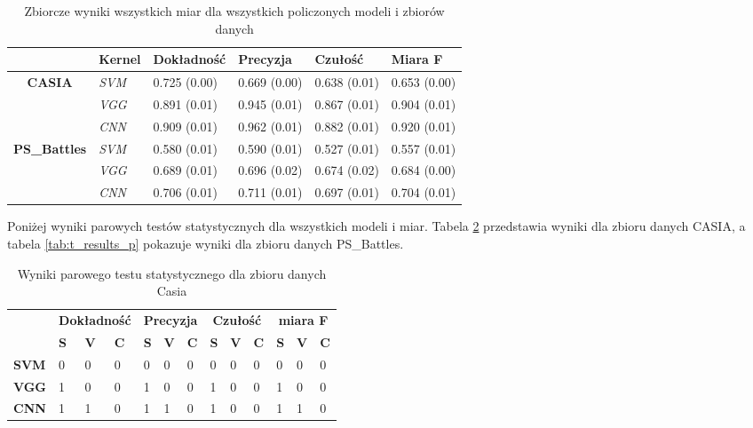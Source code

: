 \begin{table}[h!]
	\centering
	\begin{tabular}{l|l|l|l|l|l|}
		\cline{2-6}
		& \textbf{Kernel} & \textbf{Dokładność} & \textbf{Precyzja} & \textbf{Czułość} & \textbf{Miara F} \\ \hline
		\multicolumn{1}{|c|}{\multirow{3}{*}{\textbf{CASIA}}}       & \textit{SVM} & 0.725 (0.00) & 0.669 (0.00) & 0.638 (0.01) & 0.653 (0.00) \\ \cline{2-6} 
		\multicolumn{1}{|c|}{} & \textit{VGG}    & 0.891 (0.01)        & 0.945 (0.01)      & 0.867 (0.01)     & 0.904 (0.01)     \\ \cline{2-6} 
		\multicolumn{1}{|c|}{} & \textit{CNN}    & 0.909 (0.01)        & 0.962 (0.01)      & 0.882 (0.01)     & 0.920 (0.01)     \\ \hline
		\multicolumn{1}{|l|}{\multirow{3}{*}{\textbf{PS\_Battles}}} & \textit{SVM} & 0.580 (0.01) & 0.590 (0.01) & 0.527 (0.01) & 0.557 (0.01) \\ \cline{2-6} 
		\multicolumn{1}{|l|}{} & \textit{VGG}    & 0.689 (0.01)        & 0.696 (0.02)      & 0.674 (0.02)     & 0.684 (0.00)     \\ \cline{2-6} 
		\multicolumn{1}{|l|}{} & \textit{CNN}    & 0.706 (0.01)        & 0.711 (0.01)      & 0.697 (0.01)     & 0.704 (0.01)     \\ \hline
	\end{tabular}
	\caption{Zbiorcze wyniki wszystkich miar dla wszystkich policzonych modeli i zbiorów danych}
	\label{tab:all_result}
\end{table}

Poniżej wyniki parowych testów statystycznych dla wszystkich modeli i miar. Tabela \ref{tab:t_results} przedstawia wyniki dla zbioru danych CASIA, a tabela \ref{tab:t_results_p} pokazuje wyniki dla zbioru danych PS\_Battles.

\begin{table}[h!]
	\centering
	\begin{tabular}{l|l|l|l|l|l|l|l|l|l|l|l|l|}
		\cline{2-13}
		&
		\multicolumn{3}{c|}{\textbf{Dokładność}} &
		\multicolumn{3}{c|}{\textbf{Precyzja}} &
		\multicolumn{3}{c|}{\textbf{Czułość}} &
		\multicolumn{3}{c|}{\textbf{miara F}} \\ \cline{2-13} 
		&
		\textbf{S} &
		\textbf{V} &
		\textbf{C} &
		\textbf{S} &
		\textbf{V} &
		\textbf{C} &
		\textbf{S} &
		\textbf{V} &
		\textbf{C} &
		\textbf{S} &
		\textbf{V} &
		\textbf{C} \\ \hline
		\multicolumn{1}{|l|}{\textbf{SVM}} & 0 & 0 & 0 & 0 & 0 & 0 & 0 & 0 & 0 & 0 & 0 & 0 \\ \hline
		\multicolumn{1}{|l|}{\textbf{VGG}} & 1 & 0 & 0 & 1 & 0 & 0 & 1 & 0 & 0 & 1 & 0 & 0 \\ \hline
		\multicolumn{1}{|l|}{\textbf{CNN}} & 1 & 1 & 0 & 1 & 1 & 0 & 1 & 0 & 0 & 1 & 1 & 0 \\ \hline
	\end{tabular}
	\caption{Wyniki parowego testu statystycznego dla zbioru danych Casia}
	\label{tab:t_results}
\end{table}

